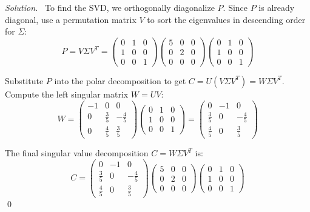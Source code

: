 \documentclass[12pt,a4paper]{article}
\newenvironment{solution}{%
  \par\noindent\textit{Solution.}\ }{\qed}
\theoremstyle{problemstyle}
\begin{document}
\begin{solution}
To find the SVD, we orthogonally diagonalize \( P \). Since \( P \) is already diagonal, use a permutation matrix \( V \) to sort the eigenvalues in descending order for \( \Sigma \):
\[ P = V \Sigma V^T = \begin{pmatrix} 0 & 1 & 0 \\ 1 & 0 & 0 \\ 0 & 0 & 1 \end{pmatrix} \begin{pmatrix} 5 & 0 & 0 \\ 0 & 2 & 0 \\ 0 & 0 & 0 \end{pmatrix} \begin{pmatrix} 0 & 1 & 0 \\ 1 & 0 & 0 \\ 0 & 0 & 1 \end{pmatrix} \]

Substitute \( P \) into the polar decomposition to get \( C = U(V \Sigma V^T) = W \Sigma V^T \). Compute the left singular matrix \( W = UV \):
\[ W = \begin{pmatrix} -1 & 0 & 0 \\ 0 & \frac{3}{5} & -\frac{4}{5} \\ 0 & \frac{4}{5} & \frac{3}{5} \end{pmatrix} \begin{pmatrix} 0 & 1 & 0 \\ 1 & 0 & 0 \\ 0 & 0 & 1 \end{pmatrix} = \begin{pmatrix} 0 & -1 & 0 \\ \frac{3}{5} & 0 & -\frac{4}{5} \\ \frac{4}{5} & 0 & \frac{3}{5} \end{pmatrix} \]

The final singular value decomposition \( C = W \Sigma V^T \) is:
\[ C = \begin{pmatrix} 0 & -1 & 0 \\ \frac{3}{5} & 0 & -\frac{4}{5} \\ \frac{4}{5} & 0 & \frac{3}{5} \end{pmatrix} \begin{pmatrix} 5 & 0 & 0 \\ 0 & 2 & 0 \\ 0 & 0 & 0 \end{pmatrix} \begin{pmatrix} 0 & 1 & 0 \\ 1 & 0 & 0 \\ 0 & 0 & 1 \end{pmatrix} \]
\end{solution}
\end{document}
